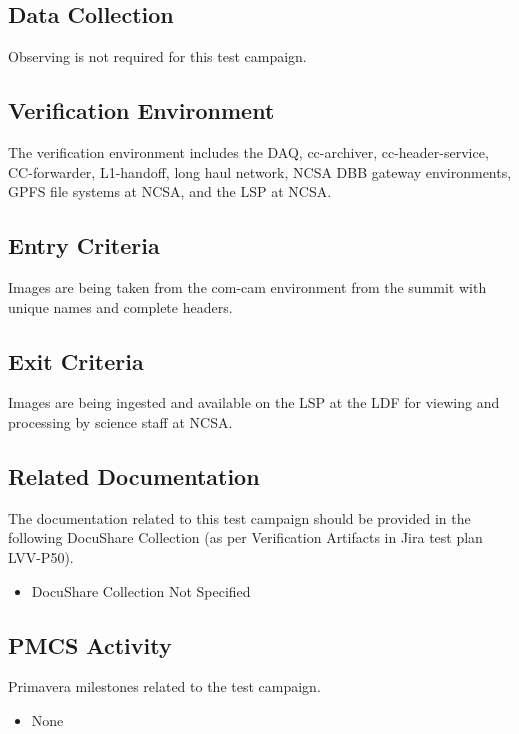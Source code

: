 \documentclass[DM,lsstdraft,STR,toc]{lsstdoc}
\begin{document}
\subsection{Data Collection}

  Observing is not required for this test campaign.

\subsection{Verification Environment}
\label{sect:hwconf}
  The verification environment includes the DAQ, cc-archiver,
cc-header-service, CC-forwarder, L1-handoff, long haul network, NCSA DBB
gateway environments, GPFS file systems at NCSA, and the LSP at NCSA. ~~

  \subsection{Entry Criteria}
  Images are being taken from the com-cam environment from the summit with
unique names and complete headers.~

  \subsection{Exit Criteria}
  Images are being ingested and available on the LSP at the LDF for
viewing and processing by science staff at NCSA.~~


\subsection{Related Documentation}

The documentation related to this test campaign should be provided in the following DocuShare Collection
(as per Verification Artifacts in Jira test plan LVV-P50).

\begin{itemize}
\item DocuShare Collection Not Specified
\end{itemize}



\subsection{PMCS Activity}

Primavera milestones related to the test campaign.

\begin{itemize}
\item None
\end{itemize}
\end{document}

